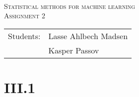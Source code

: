 \documentclass{article}
\begin{document}
\begin{titlepage}
\begin{center}
    \hline \\[0.2cm]
\textsc{\Large Statistical methods for machine learning}\\[0.5cm]
\textsc{\large Assignment 2}\\[0.5cm]
    \hline
    \hline
\vspace{2 cm}
\begin{tabular}{ll}
Students: & Lasse Ahlbech Madsen \\
          & Kasper Passov\\
\end{tabular}
\end{center}
\vspace{5 cm}
\newpage
\end{titlepage}

\section{III.1}


\end{document}
